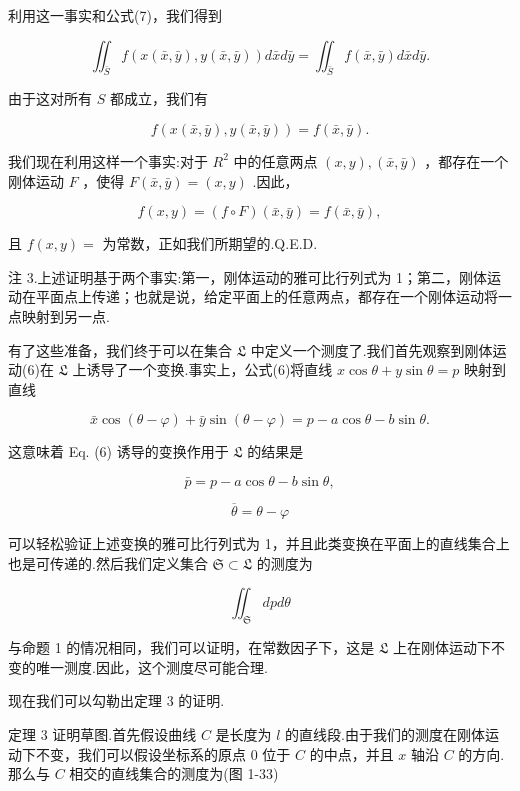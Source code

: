 利用这一事实和公式(7)，我们得到

\[
{\iint }_{\bar{S}}f\left( {x\left( {\bar{x},\bar{y}}\right) ,y\left( {\bar{x},\bar{y}}\right) }\right) d\bar{x}d\bar{y} = {\iint }_{\bar{S}}f\left( {\bar{x},\bar{y}}\right) d\bar{x}d\bar{y}.
\]

由于这对所有 \(S\) 都成立，我们有

\[
f\left( {x\left( {\bar{x},\bar{y}}\right) ,y\left( {\bar{x},\bar{y}}\right) }\right)  = f\left( {\bar{x},\bar{y}}\right) .
\]

我们现在利用这样一个事实:对于 \({R}^{2}\) 中的任意两点 \(\left( {x,y}\right) ,\left( {\bar{x},\bar{y}}\right)\) ，都存在一个刚体运动 \(F\) ，使得 \(F\left( {\bar{x},\bar{y}}\right)  = \left( {x,y}\right)\) .因此，

\[
f\left( {x,y}\right)  = \left( {f \circ  F}\right) \left( {\bar{x},\bar{y}}\right)  = f\left( {\bar{x},\bar{y}}\right) ,
\]

且 \(f\left( {x,y}\right)  =\) 为常数，正如我们所期望的.Q.E.D.

注 3.上述证明基于两个事实:第一，刚体运动的雅可比行列式为 1；第二，刚体运动在平面点上传递；也就是说，给定平面上的任意两点，都存在一个刚体运动将一点映射到另一点.

有了这些准备，我们终于可以在集合 \(\mathfrak{L}\) 中定义一个测度了.我们首先观察到刚体运动(6)在 \(\mathfrak{L}\) 上诱导了一个变换.事实上，公式(6)将直线 \(x\cos \theta  + y\sin \theta  = p\) 映射到直线

\[
\bar{x}\cos \left( {\theta  - \varphi }\right)  + \bar{y}\sin \left( {\theta  - \varphi }\right)  = p - a\cos \theta  - b\sin \theta .
\]

这意味着 Eq. (6) 诱导的变换作用于 \(\mathfrak{L}\) 的结果是

\[
\bar{p} = p - a\cos \theta  - b\sin \theta ,
\]

\[
\overline{\theta } = \theta  - \varphi
\]

可以轻松验证上述变换的雅可比行列式为 1，并且此类变换在平面上的直线集合上也是可传递的.然后我们定义集合 \(\mathfrak{S} \subset  \mathfrak{L}\) 的测度为

\[
{\iint }_{\mathfrak{S}}{dpd\theta }
\]

与命题 1 的情况相同，我们可以证明，在常数因子下，这是 \(\mathfrak{L}\) 上在刚体运动下不变的唯一测度.因此，这个测度尽可能合理.

现在我们可以勾勒出定理 3 的证明.

定理 3 证明草图.首先假设曲线 \(C\) 是长度为 \(l\) 的直线段.由于我们的测度在刚体运动下不变，我们可以假设坐标系的原点 0 位于 \(C\) 的中点，并且 \(x\) 轴沿 \(C\) 的方向.那么与 \(C\) 相交的直线集合的测度为(图 1-33)


